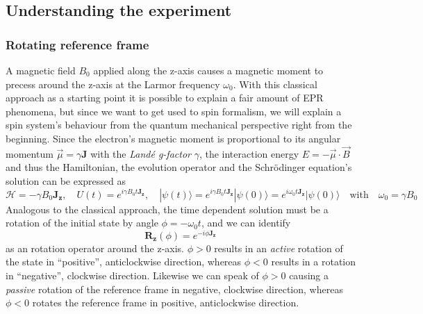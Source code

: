 \documentclass[11.5pt,a4paper]{article}
\begin{document}
\subsection{Understanding the experiment}

\subsubsection{Rotating reference frame}
A magnetic field $B_0$ applied along the z-axis causes a magnetic moment to precess around the z-axis at the Larmor frequency $\omega_0$. With this classical approach as a starting point it is possible to explain a fair amount of EPR phenomena, but since we want to get used to spin formalism, we will explain a spin system's behaviour from the quantum mechanical perspective right from the beginning. Since the electron's magnetic moment is proportional to its angular momentum $\vec{\mu} = \gamma \mathbf{J}$ with the \emph{Land\'e g-factor} $\gamma$, the interaction energy $E = - \vec{\mu} \cdot \vec{B}$ and thus the Hamiltonian, the evolution operator and the Schr\"odinger equation's solution can be expressed as
\begin{equation}
  \mathcal{H} = - \gamma B_0 \mathbf{J_z}, \quad U(t) = e^{i \gamma B_0 t \mathbf{J_z}}, \quad |\psi(t)\rangle = e^{i \gamma B_0 t \mathbf{J_z}} |\psi(0)\rangle = e^{i \omega_0 t \mathbf{J_z}} |\psi(0)\rangle \quad \text{with} \quad \omega_0 = \gamma B_0
\end{equation}
Analogous to the classical approach, the time dependent solution must be a rotation of the initial state by angle $\phi = -\omega_0 t$, and we can identify 
\begin{equation}
 \mathbf{R_z}(\phi) = e^{-i\phi \mathbf{J_z}}
\label{eq-z-rotation}
\end{equation}
as an rotation operator around the z-axis. $\phi > 0$ results in an \emph{active} rotation of the state in ``positive'', anticlockwise direction, whereas $\phi < 0$ results in  a rotation in ``negative'', clockwise direction. Likewise we can speak of $\phi > 0$ causing a \emph{passive} rotation of the reference frame in negative, clockwise direction, whereas $\phi < 0$ rotates the reference frame in positive, anticlockwise direction.
\end{document}

